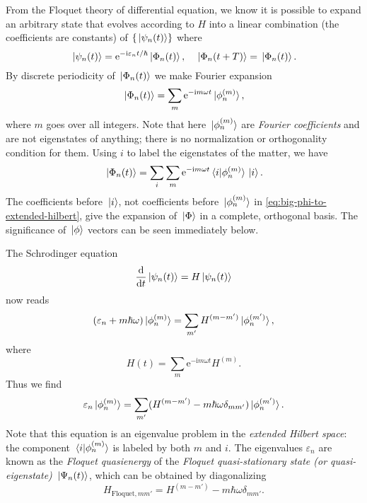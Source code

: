 \documentclass[hyperref, a4paper]{article}
\newcommand*{\ii}{\mathrm{i}}
\newcommand*{\ee}{\mathrm{e}}
\begin{document}
From the Floquet theory of differential equation, 
we know it is possible to expand an arbitrary state that 
evolves according to $H$ into 
a linear combination (the coefficients are constants) of 
$\{\ket*{\psi_n(t)}\}$ where 
\begin{equation}
    \ket*{\psi_n (t)} = \ee^{- \ii \varepsilon_n t / \hbar} \ket*{\Phi_n(t)},
    \quad \ket*{\Phi_n(t + T)} = \ket*{\Phi_n(t)}.
    \label{eq:floquet-wave-function}
\end{equation}
By discrete periodicity of $\ket*{\Phi_n(t)}$ we make Fourier expansion 
\begin{equation}
    \ket*{\Phi_n(t)} = \sum_m \ee^{- \ii m \omega t} \ket*{\phi_n^{(m)}},
    \label{eq:big-phi-to-extended-hilbert}
\end{equation}
where $m$ goes over all integers.
Note that here $\ket*{\phi_n^{(m)}}$
are \emph{Fourier coefficients} and are not eigenstates of anything; 
there is no normalization or orthogonality condition for them.
Using $i$ to label the eigenstates of the matter, 
we have 
\begin{equation}
    \ket*{\Phi_n(t)} = \sum_{i} \sum_{m}
    \ee^{- \ii m \omega t} \braket*{i}{\phi_n^{(m)}} \ket*{i}.
\end{equation}
The coefficients before $\ket*{i}$, 
not coefficients before $\ket*{\phi_n^{(m)}}$ in \eqref{eq:big-phi-to-extended-hilbert}, 
give the expansion of $\ket*{\Phi}$ in a 
complete, orthogonal basis.
The significance of $\ket*{\phi}$ vectors can be seen immediately below.

The Schrodinger equation 
\begin{equation}
    \dv{t} \ket*{\psi_n(t)} = H \ket*{\psi_n(t)}
\end{equation}
now reads 
\begin{equation}
    (\varepsilon_n + m \hbar \omega) \ket*{\phi_n^{(m)}} 
    = \sum_{m'} H^{(m - m')} \ket*{\phi_n^{(m')}},
\end{equation}
where 
\begin{equation}
    H(t) = \sum_{m} \ee^{- \ii m \omega t} H^{(m)}.
\end{equation}
Thus we find 
\begin{equation}
    \varepsilon_n \ket*{\phi^{(m)}_n}
    = \sum_{m'} (
        H^{(m - m')} - m \hbar \omega \delta_{m m'}
    ) \ket*{\phi^{(m')}_{n}}.
    \label{eq:floquet-ham-eigen}
\end{equation}
Note that this equation is an eigenvalue problem in the \emph{extended Hilbert space}:
the component $\braket*{i}{\phi_n^{(m)}}$ is labeled by both $m$ and $i$.
The eigenvalues $\varepsilon_n$ are known as the \emph{Floquet quasienergy} of 
the \emph{Floquet quasi-stationary state (or quasi-eigenstate)} $\ket*{\Psi_n(t)}$,
which can be obtained by diagonalizing 
\begin{equation}
    H_{\text{Floquet}, mm'} = H^{(m - m')} - m \hbar \omega \delta_{m m'}.
    \label{eq:floquet-ham}
\end{equation}
\end{document}
